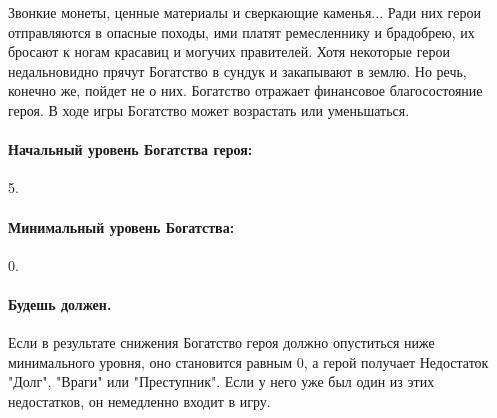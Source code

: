 Звонкие монеты, ценные материалы и сверкающие каменья... Ради них герои отправляются в опасные походы, ими платят ремесленнику и брадобрею, их бросают к ногам красавиц и могучих правителей. Хотя некоторые герои недальновидно прячут Богатство в сундук и закапывают в землю. Но речь, конечно же, пойдет не о них.
\newline Богатство отражает финансовое благосостояние героя. В ходе игры Богатство может возрастать или уменьшаться.
\paragraph{Начальный уровень Богатства героя:} 5.
\paragraph{Минимальный уровень Богатства:} 0.
\paragraph{Будешь должен.} Если в результате снижения Богатство героя должно опуститься ниже минимального уровня, оно становится равным 0, а герой получает Недостаток "Долг", "Враги" или "Преступник". Если у него уже был один из этих недостатков, он немедленно входит в игру.
